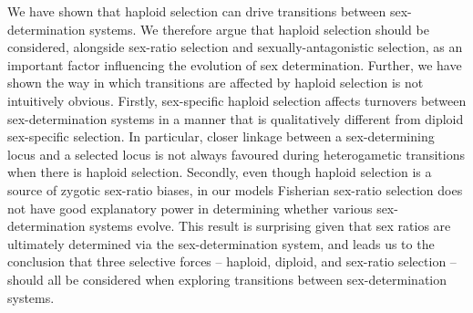 \documentclass[12pt]{article}
\begin{document}
We have shown that haploid selection can drive transitions between sex-determination systems.
We therefore argue that haploid selection should be considered, alongside sex-ratio selection and sexually-antagonistic selection, as an important factor influencing the evolution of sex determination. 
Further, we have shown the way in which transitions are affected by haploid selection is not intuitively obvious. 
Firstly, sex-specific haploid selection affects turnovers between sex-determination systems in a manner that is qualitatively different from diploid sex-specific selection. 
In particular, closer linkage between a sex-determining locus and a selected locus is not always favoured during heterogametic transitions when there is haploid selection. 
Secondly, even though haploid selection is a source of zygotic sex-ratio biases, in our models Fisherian sex-ratio selection does not have good explanatory power in determining whether various sex-determination systems evolve. This result is surprising given that sex ratios are ultimately determined via the sex-determination system, and leads us to the conclusion that three selective forces -- haploid, diploid, and sex-ratio selection -- should all be considered when exploring transitions between sex-determination systems.


\end{document}
